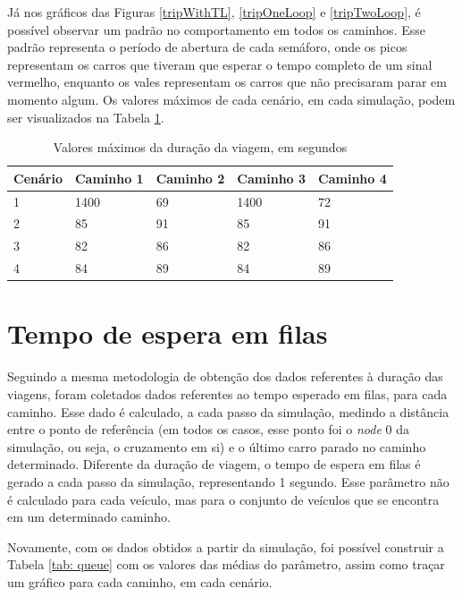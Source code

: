 Já nos gráficos das Figuras \ref{tripWithTL}, \ref{tripOneLoop} e \ref{tripTwoLoop}, é possível observar um padrão no comportamento em todos os caminhos. Esse padrão representa o período de abertura de cada semáforo, onde os picos representam os carros que tiveram que esperar o tempo completo de um sinal vermelho, enquanto os vales representam os carros que não precisaram parar em momento algum.
Os valores máximos de cada cenário, em cada simulação, podem ser visualizados na Tabela \ref{tab: durationMax}.

\begin{table}[H]
\centering
\caption{Valores máximos da duração da viagem, em segundos}
\label{tab: durationMax}
\begin{tabular}{@{}lllll@{}}
\toprule
Cenário & Caminho 1 & Caminho 2 & Caminho 3 & Caminho 4 \\ \midrule
1 & 1400 & 69 & 1400 & 72 \\
2 & 85 & 91 & 85 & 91 \\
3 &	82 & 86 & 82 & 86 \\
4 & 84 & 89 & 84 & 89 \\
\bottomrule
\end{tabular}
\end{table}

\section{Tempo de espera em filas}
Seguindo a mesma metodologia de obtenção dos dados referentes à duração das viagens, foram coletados dados referentes ao tempo esperado em filas, para cada caminho. Esse dado é calculado, a cada passo da simulação, medindo a distância entre o ponto de referência (em todos os casos, esse ponto foi o \textit{node} 0 da simulação, ou seja, o cruzamento em si) e o último carro parado no caminho determinado. Diferente da duração de viagem, o tempo de espera em filas é gerado a cada passo da simulação, representando 1 segundo. Esse parâmetro não é calculado para cada veículo, mas para o conjunto de veículos que se encontra em um determinado caminho.

Novamente, com os dados obtidos a partir da simulação, foi possível construir a Tabela \ref{tab: queue} com os valores das médias do parâmetro, assim como traçar um gráfico para cada caminho, em cada cenário.

